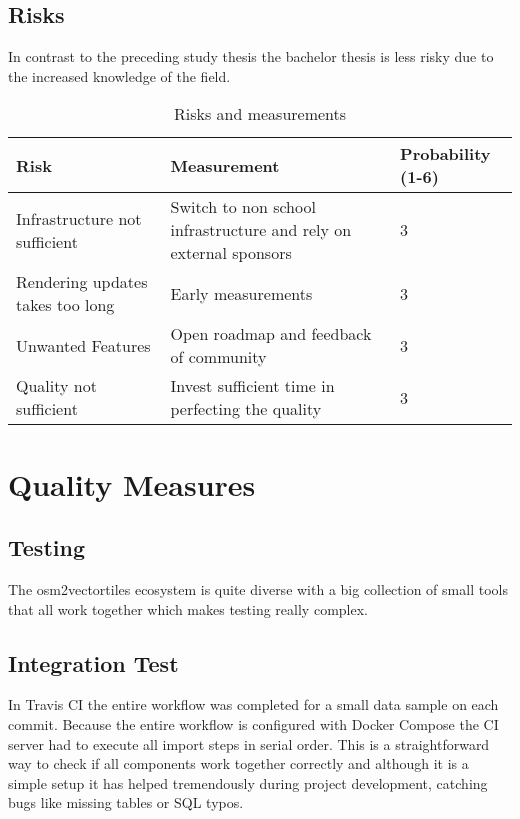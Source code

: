 \section{Risks}\label{risks}

In contrast to the preceding study thesis the bachelor thesis is less risky due
to the increased knowledge of the field.

\begin{table}[H]
\centering
    \begin{tabular}{p{5.5cm} p{6.5cm} p{1.8cm}}
    \hline
    Risk & Measurement & Probability (1-6)\\
    \hline
    Infrastructure not sufficient & Switch to non school infrastructure and rely on external sponsors & 3\\
    Rendering updates takes too long & Early measurements & 3\\
    Unwanted Features & Open roadmap and feedback of community & 3\\
    Quality not sufficient & Invest sufficient time in perfecting the quality & 3\\
    \end{tabular}
    \caption{Risks and measurements}
\end{table}

\newpage
\chapter{Quality Measures}\label{quality-measures}

\section{Testing}\label{testing}

The osm2vectortiles ecosystem is quite diverse with a big collection of small tools that all work together which makes testing really complex.

\section{Integration Test}

In Travis CI\cite{pm_5_travis-ci.org_2015}  the entire workflow was completed for a small data sample on each commit.
Because the entire workflow is configured with Docker Compose \cite{pm_6_docs.docker.com_2015} the CI server had to execute all import steps in serial order. This is a straightforward way to check if all components work together correctly
and although it is a simple setup it has helped tremendously during project development, catching bugs
like missing tables or SQL typos.


